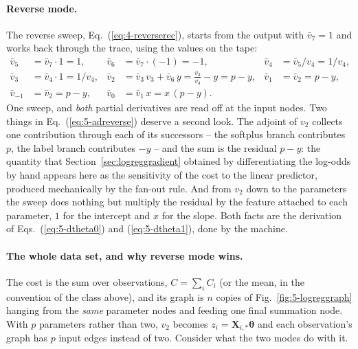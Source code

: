 \paragraph{Reverse mode.}
The reverse sweep, Eq.~(\ref{eq:4-reverserec}), starts from the output with
$\bar v_7=1$ and works back through the trace, using the values on the tape:
\begin{equation}
  \begin{aligned}
    \bar v_5 &= \bar v_7\cdot1 = 1, &
    \bar v_6 &= \bar v_7\cdot(-1) = -1, &
    \bar v_4 &= \bar v_5/v_4 = 1/v_4, \\
    \bar v_3 &= \bar v_4\cdot 1 = 1/v_4, &
    \bar v_2 &= \bar v_3\,v_3 + \bar v_6\,y = \frac{v_3}{v_4}-y = p-y, &
    \bar v_1 &= \bar v_2 = p-y, \\
    \bar v_{-1} &= \bar v_2 = p-y, &
    \bar v_0 &= \bar v_1\,x = x\,(p-y) .
  \end{aligned}
  \label{eq:5-adreverse}
\end{equation}
One sweep, and \emph{both} partial derivatives are read off at the input
nodes.  Two things in Eq.~(\ref{eq:5-adreverse}) deserve a second look.
The adjoint of $v_2$ collects one contribution through each of its
successors -- the softplus branch contributes $p$, the label branch
contributes $-y$ -- and the sum is the residual $p-y$: the quantity that
Section~\ref{sec:logreggradient} obtained by differentiating the log-odds by
hand appears here as the sensitivity of the cost to the linear predictor,
produced mechanically by the fan-out rule.  And from $v_2$ down to the
parameters the sweep does nothing but multiply the residual by the feature
attached to each parameter, $1$ for the intercept and $x$ for the slope.
Both facts are the derivation of Eqs.~(\ref{eq:5-dtheta0}) and
(\ref{eq:5-dtheta1}), done by the machine.

\paragraph{The whole data set, and why reverse mode wins.}
The cost is the sum over observations, $C=\sum_i C_i$ (or the mean, in the
convention of the class above), and its graph is $n$ copies of
Fig.~\ref{fig:5-logreggraph} hanging from the \emph{same} parameter nodes
and feeding one final summation node.  With $p$ parameters rather than
two, $v_2$ becomes $z_i=\bm{X}_{i,\ast}\bm{\theta}$ and each observation's
graph has $p$ input edges instead of two.  Consider what the two modes do
with it.

